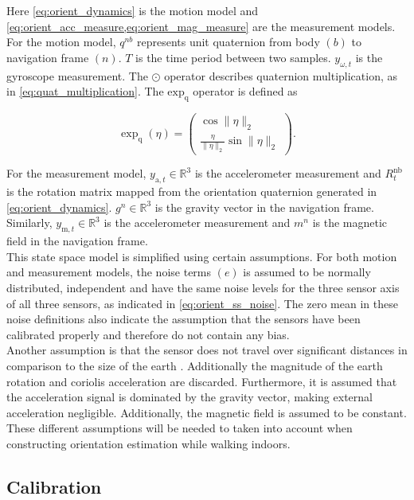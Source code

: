 Here \eqref{eq:orient_dynamics} is the motion model and \eqref{eq:orient_acc_measure,eq:orient_mag_measure} are the measurement models. \\
For the motion model, $q^{nb}$ represents unit quaternion from body $(b)$ to navigation frame $(n)$. $T$ is the time period between two samples. $y_{\omega, t}$ is the gyroscope measurement. The $\odot$ operator describes quaternion multiplication, as in \eqref{eq:quat_multiplication}. The $\text{exp}_\text{q}$ operator is defined as

\begin{equation}
	\exp_\mathrm{q} (\eta) = \left(\begin{array}{c}{\cos \|\eta\|_{2}} \\ {\frac{\eta}{\|\eta\|_{2}} \sin \|\eta\|_{2}}\end{array}\right) \label{eq:exp_q_in_text}.
\end{equation}

For the measurement model, $y_{\mathrm{a}, t}\in \mathbb{R}^3$ is the accelerometer measurement and $R^\mathrm{nb}_t$ is the rotation matrix mapped from the orientation quaternion generated in \eqref{eq:orient_dynamics}. $g^n \in \mathbb{R}^3$ is the gravity vector in the navigation frame. Similarly, $y_{\mathrm{m}, t}\in \mathbb{R}^3$ is the accelerometer measurement and $m^n$ is the magnetic field in the navigation frame. \\
This state space model is simplified using certain assumptions.
For both motion and measurement models, the noise terms  $(e)$ is assumed to be normally distributed, independent and have the same noise levels for the three sensor axis of all three sensors, as indicated in \eqref{eq:orient_ss_noise}. The zero mean in these noise definitions also indicate the assumption that the sensors have been calibrated properly and therefore do not contain any bias. \\
Another assumption is that the sensor does not travel over significant distances in comparison to the size of the earth \cite{Kok2017}. Additionally the magnitude of the earth rotation and coriolis acceleration are discarded. Furthermore, it is assumed that the acceleration signal is dominated by the gravity vector, making external acceleration negligible. Additionally, the magnetic field is assumed to be constant. These different assumptions will be needed to taken into account when constructing orientation estimation while walking indoors.

\subsection{Calibration}

